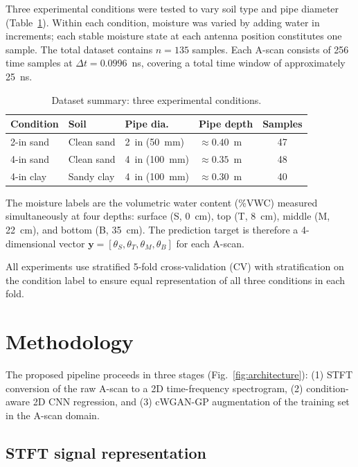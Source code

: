 \documentclass[review]{elsarticle}
\begin{document}
Three experimental conditions were tested to vary soil type and pipe diameter (Table~\ref{tab:dataset}). Within each condition, moisture was varied by adding water in increments; each stable moisture state at each antenna position constitutes one sample. The total dataset contains $n = 135$ samples. Each A-scan consists of 256 time samples at $\Delta t = 0.0996$~ns, covering a total time window of approximately 25~ns.

\begin{table}[htbp]
\centering
\caption{Dataset summary: three experimental conditions.}
\label{tab:dataset}
\begin{tabular}{llllc}
\toprule
Condition & Soil & Pipe dia. & Pipe depth & Samples \\
\midrule
2-in sand   & Clean sand     & 2~in (50~mm)  & $\approx 0.40$~m & 47 \\
4-in sand   & Clean sand     & 4~in (100~mm) & $\approx 0.35$~m & 48 \\
4-in clay   & Sandy clay     & 4~in (100~mm) & $\approx 0.30$~m & 40 \\
\bottomrule
\end{tabular}
\end{table}

The moisture labels are the volumetric water content (\%VWC) measured simultaneously at four depths: surface (S, 0~cm), top (T, 8~cm), middle (M, 22~cm), and bottom (B, 35~cm). The prediction target is therefore a 4-dimensional vector $\mathbf{y} = [\theta_S, \theta_T, \theta_M, \theta_B]$ for each A-scan.

All experiments use stratified 5-fold cross-validation (CV) with stratification on the condition label to ensure equal representation of all three conditions in each fold.


\section{Methodology}
\label{sec:method}

The proposed pipeline proceeds in three stages (Fig.~\ref{fig:architecture}): (1) STFT conversion of the raw A-scan to a 2D time-frequency spectrogram, (2) condition-aware 2D CNN regression, and (3) cWGAN-GP augmentation of the training set in the A-scan domain.

\subsection{STFT signal representation}
\label{sec:stft}
\end{document}
